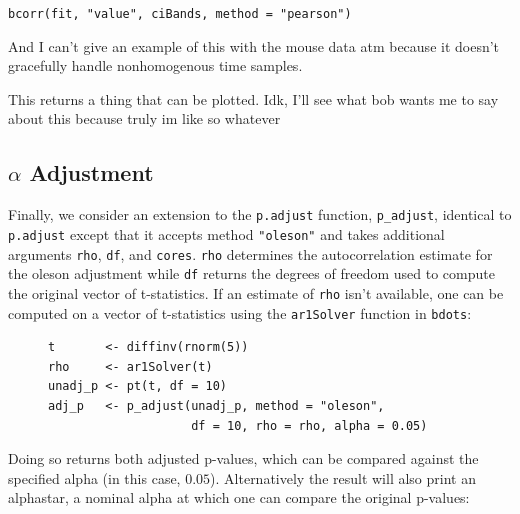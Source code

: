 \documentclass{article}
\newcommand{\xt}{\texttt}%
\begin{document}
\begin{center}
\xt{bcorr(fit, "value", ciBands, method = "pearson")} 
\end{center}

And I can't give an example of this with the mouse data atm because it doesn't gracefully handle nonhomogenous time samples.

This returns a thing that can be plotted. Idk, I'll see what bob wants me to say about this because truly im like so whatever

\subsection{$\alpha$ Adjustment}

Finally, we consider an extension to the \texttt{p.adjust} function, \texttt{p\_adjust}, identical to \texttt{p.adjust} except that it accepts method \texttt{"oleson"} and takes additional arguments \texttt{rho}, \texttt{df}, and \texttt{cores}. \texttt{rho} determines the autocorrelation estimate for the oleson adjustment while \texttt{df} returns the degrees of freedom used to compute the original vector of t-statistics. If an estimate of \texttt{rho} isn't available, one can be computed on a vector of t-statistics using the \texttt{ar1Solver} function in \xt{bdots}:



\begin{singlespace}
\begin{figure}[H]
\centering
\begin{BVerbatim}
t       <- diffinv(rnorm(5))
rho     <- ar1Solver(t)
unadj_p <- pt(t, df = 10)
adj_p   <- p_adjust(unadj_p, method = "oleson", 
                    df = 10, rho = rho, alpha = 0.05)
\end{BVerbatim}
\end{figure}
\end{singlespace}

Doing so returns both adjusted p-values, which can be compared against the specified alpha (in this case, $0.05$). Alternatively the result will also print an alphastar, a nominal alpha at which one can compare the original p-values:
\end{document}
